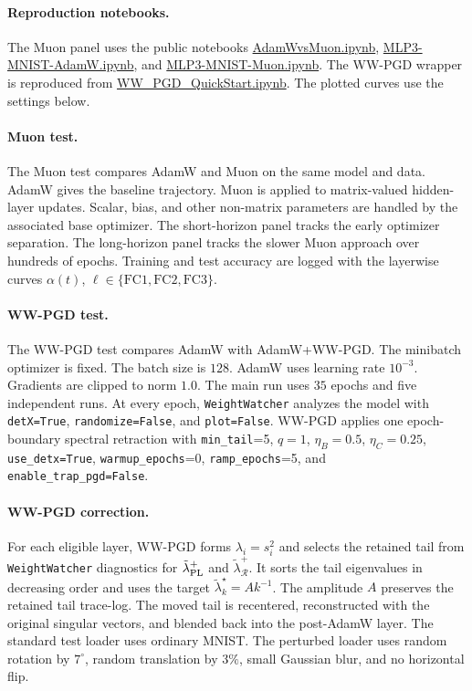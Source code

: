 \documentclass[10pt,twocolumn]{article}
\newcommand{\WW}{\texttt{WeightWatcher}}
\newcommand{\Rell}{\mathcal R}
\begin{document}
\paragraph{Reproduction notebooks.}
The Muon panel uses the public notebooks \href{https://github.com/CalculatedContent/WeightWatcher-Examples/blob/main/AdamWvsMuon.ipynb}{AdamWvsMuon.ipynb}, \href{https://github.com/CalculatedContent/WeightWatcher-Examples/blob/main/MLP3-MNIST-AdamW.ipynb}{MLP3-MNIST-AdamW.ipynb}, and \href{https://github.com/CalculatedContent/WeightWatcher-Examples/blob/main/MLP3-MNIST-Muon.ipynb}{MLP3-MNIST-Muon.ipynb}. The WW-PGD wrapper is reproduced from \href{https://github.com/CalculatedContent/WW_PGD/blob/main/WW_PGD_QuickStart.ipynb}{WW\_PGD\_QuickStart.ipynb}. The plotted curves use the settings below.

\paragraph{Muon test.}
The Muon test compares AdamW and Muon on the same model and data. AdamW gives the baseline trajectory. Muon is applied to matrix-valued hidden-layer updates. Scalar, bias, and other non-matrix parameters are handled by the associated base optimizer. The short-horizon panel tracks the early optimizer separation. The long-horizon panel tracks the slower Muon approach over hundreds of epochs. Training and test accuracy are logged with the layerwise curves $\alpha(t)$, $\ell\in\{\mathrm{FC1},\mathrm{FC2},\mathrm{FC3}\}$.

\paragraph{WW-PGD test.}
The WW-PGD test compares AdamW with AdamW+WW-PGD. The minibatch optimizer is fixed. The batch size is $128$. AdamW uses learning rate $10^{-3}$. Gradients are clipped to norm $1.0$. The main run uses $35$ epochs and five independent runs. At every epoch, \WW{} analyzes the model with \texttt{detX=True}, \texttt{randomize=False}, and \texttt{plot=False}. WW-PGD applies one epoch-boundary spectral retraction with \texttt{min\_tail}=5, $q=1$, $\eta_B=0.5$, $\eta_C=0.25$, \texttt{use\_detx=True}, \texttt{warmup\_epochs}=0, \texttt{ramp\_epochs}=5, and \texttt{enable\_trap\_pgd=False}.

\paragraph{WW-PGD correction.}
For each eligible layer, WW-PGD forms $\lambda_i=s_i^2$ and selects the retained tail from \WW{} diagnostics for $\tilde{\lambda}^{+}_{\rm PL}$ and $\tilde{\lambda}^{+}_{\Rell}$. It sorts the tail eigenvalues in decreasing order and uses the target $\tilde{\lambda}_k^\star=A k^{-1}$. The amplitude $A$ preserves the retained tail trace-log. The moved tail is recentered, reconstructed with the original singular vectors, and blended back into the post-AdamW layer. The standard test loader uses ordinary MNIST. The perturbed loader uses random rotation by $7^\circ$, random translation by $3\%$, small Gaussian blur, and no horizontal flip.
\end{document}
